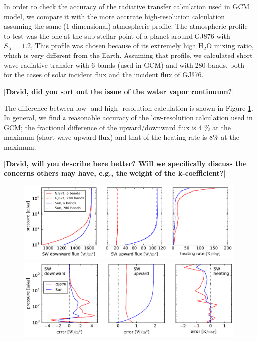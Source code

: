 \documentclass[11pt,numberedappendix,twocolappendix,]{emulateapj}
\def\water{H$_2$O }
\def\memo#1{\color{red}$[${\bf #1}$]$ \color{black}}
\begin{document}
In order to check the accuracy of the radiative transfer calculation used in GCM model, we compare it with the more accurate high-resolution calculation assuming the same (1-dimensional) atmospheric profile. 
The atmospheric profile to test was the one at the sub-stellar point of a planet around GJ876 with $S_X=1.2$, 
This profile was chosen because of its extremely high \water mixing ratio, which is very different from the Earth. 
Assuming that profile, we calculated short wave radiative transfer with 6 bands (used in GCM) and with 280 bands, both for the cases of solar incident flux and the incident flux of GJ876. 

\memo{David, did you sort out the issue of the water vapor continuum?}

The difference between low- and high- resolution calculation is shown in Figure \ref{fig:socrates}. 
In general, we find a reasonable accuracy of the low-resolution calculation used in GCM; the fractional difference of the upward/downward flux is 4 \% at the maximum (short-wave upward flux) and that of the heating rate is 8\% at the maximum. 

\memo{David, will you describe here better? Will we specifically discuss the concerns others may have, e.g., the weight of the k-coefficient?}

\begin{figure}[!htb]
    \begin{center}
    \includegraphics[width=0.8\hsize]{fig/rad_comparison_AqOH0TLS_GJ876S12P21L40Q.pdf}
    \includegraphics[width=0.8\hsize]{fig/rad_comparison_diff_AqOH0TLS_GJ876S12P21L40Q.pdf}
    \end{center}
\caption{}                                                                                                             
\label{fig:socrates}
\end{figure}
\end{document}

